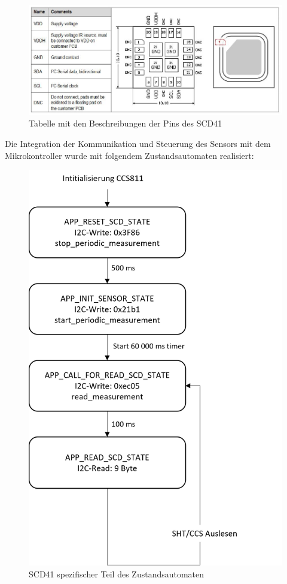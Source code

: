 \documentclass[]{article}
\begin{document}
		\begin{figure}[!h]
			\centering
			\includegraphics[scale=0.50]{images/scd_pinout}
			\caption{Tabelle mit den Beschreibungen der Pins des SCD41\cite{scd_datasheet}}
			\label{img:scd_pintable}
		\end{figure}
		Die Integration der Kommunikation und Steuerung des Sensors mit dem Mikrokontroller wurde mit folgendem Zustandsautomaten realisiert:
		\begin{figure}[!h]
			\centering
			\includegraphics[scale=0.8]{images/scd_zustand}
			\caption{SCD41 spezifischer Teil des Zustandsautomaten\cite{scd_datasheet}}
			\label{img:scd_zustand}
		\end{figure}
\end{document}
